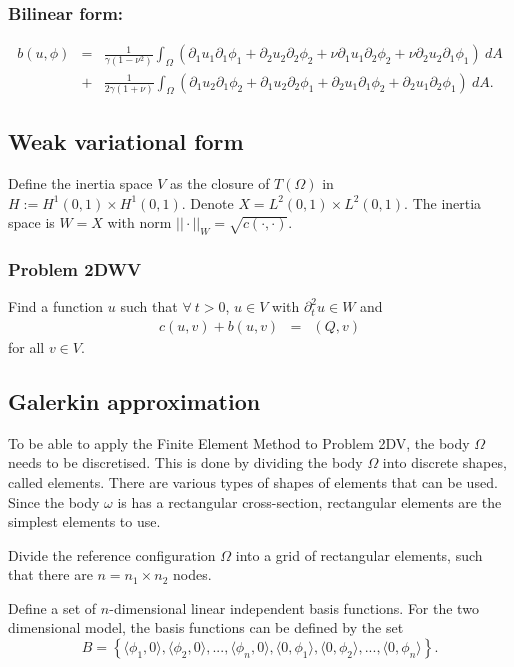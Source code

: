 \subsubsection{Bilinear form:}
\begin{align}
	b(u,\phi) & = & \frac{1}{\gamma(1-\nu^2)}\int_{\Omega} (\partial_1 u_1 \partial_1 \phi_1 + \partial_2 u_2 \partial _2 \phi_2 + \nu\partial_1 u_1 \partial_2\phi_2 + \nu \partial_2 u_2 \partial_1 \phi_1 ) \ dA \nonumber\\
	& + & \frac{1}{2\gamma(1+\nu)}\int_{\Omega} (\partial_1 u_2 \partial_1 \phi_2 + \partial_1 u_2 \partial_2 \phi_1 + \partial_2 u_1 \partial_1\phi_2 + \partial_2 u_1 \partial_2\phi_1) \ dA.
\end{align}

\subsection{Weak variational form}
Define the inertia space $V$ as the closure of $T(\Omega)$ in $H := H^1(0,1)\times H^1(0,1)$. Denote $X = L^2(0,1)\times L^2(0,1)$. The inertia space is $W  = X$ with norm $||\cdot||_W = \sqrt{c(\cdot,\cdot)}$.

\subsubsection{Problem 2DWV}
Find a function $u$ such that $\forall \ t > 0$, $u \in V$ with $\partial_t^2 u \in W$ and
\begin{eqnarray*}
	c(u,v) + b(u,v) & = & (Q,v)
\end{eqnarray*}
for all $v\in V$.


\subsection{Galerkin approximation}\label{2d_FEM_G}
To be able to apply the Finite Element Method to Problem 2DV, the body $\Omega$ needs to be discretised. This is done by dividing the body $\Omega$ into discrete shapes, called elements. There are various types of shapes of elements that can be used. Since the body $\omega$ is has a rectangular cross-section, rectangular elements are the simplest elements to use.

Divide the reference configuration $\Omega$ into a grid of rectangular elements, such that there are $n = n_1\times n_2$ nodes.

Define a set of $n$-dimensional linear independent basis functions. For the two dimensional model, the basis functions can be defined by the set $$B = \left\{\langle\phi_1, 0\rangle, \langle\phi_2, 0\rangle,...,\langle\phi_{n}, 0 \rangle,\langle 0,\phi_1\rangle,\langle 0 ,\phi_2\rangle,...,\langle 0,\phi_{n}\rangle \right\}.$$ 

